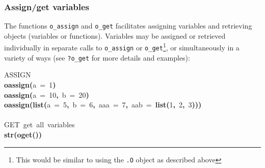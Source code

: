 \documentclass[english,10pt,a4paper]{article}\usepackage{graphicx, color}
\makeatletter
\newcommand{\hlnumber}[1]{\textcolor[rgb]{0,0,0}{#1}}%
\newcommand{\hlfunctioncall}[1]{\textcolor[rgb]{0.501960784313725,0,0.329411764705882}{\textbf{#1}}}%
\newcommand{\hlkeyword}[1]{\textcolor[rgb]{0,0,0}{\textbf{#1}}}%
\newcommand{\hlargument}[1]{\textcolor[rgb]{0.690196078431373,0.250980392156863,0.0196078431372549}{#1}}%
\newcommand{\hlcomment}[1]{\textcolor[rgb]{0.180392156862745,0.6,0.341176470588235}{#1}}%
\newcommand{\hlstd}[1]{\textcolor[rgb]{0,0,0}{#1}}%
\newenvironment{kframe}{%
 \def\FrameCommand##1{\hskip\@totalleftmargin \hskip-\fboxsep
 \colorbox{shadecolor}{##1}\hskip-\fboxsep
     \hskip-\linewidth \hskip-\@totalleftmargin \hskip\columnwidth}%
 \MakeFramed {\advance\hsize-\width
   \@totalleftmargin\z@ \linewidth\hsize
   \@setminipage}}%
 {\par\unskip\endMakeFramed}
\newenvironment{knitrout}{}{} %
\let\code=\texttt
\makeatother
\begin{document}
\subsubsection{Assign/get variables}

The functions \code{o\_assign} and \code{o\_get} facilitates assigning variables
and retrieving objects (variables or functions).
Variables may be assigned or retrieved individually in separate calls to
\code{o\_assign} or \code{o\_get}\footnote{This would be similar to using the
\code{.O} object as described above}, or simultaneously in a variety of ways
(see \code{?o\_get} for more details and examples):

\begin{knitrout}
\color{fgcolor}\begin{kframe}
\begin{flushleft}
\ttfamily\noindent
\hlcomment{\usebox{\hlnormalsizeboxhash}\usebox{\hlnormalsizeboxhash}{\ }ASSIGN}\hspace*{\fill}\\
\hlstd{}\hlfunctioncall{o\usebox{\hlnormalsizeboxunderscore}assign}\hlkeyword{(}\hlargument{a}{\ }\hlargument{=}{\ }\hlnumber{1}\hlkeyword{)}\hspace*{\fill}\\
\hlstd{}\hlfunctioncall{o\usebox{\hlnormalsizeboxunderscore}assign}\hlkeyword{(}\hlargument{a}{\ }\hlargument{=}{\ }\hlnumber{10}\hlkeyword{,}{\ }\hlargument{b}{\ }\hlargument{=}{\ }\hlnumber{20}\hlkeyword{)}\hspace*{\fill}\\
\hlstd{}\hlfunctioncall{o\usebox{\hlnormalsizeboxunderscore}assign}\hlkeyword{(}\hlfunctioncall{list}\hlkeyword{(}\hlargument{a}{\ }\hlargument{=}{\ }\hlnumber{5}\hlkeyword{,}{\ }\hlargument{b}{\ }\hlargument{=}{\ }\hlnumber{6}\hlkeyword{,}{\ }\hlargument{aaa}{\ }\hlargument{=}{\ }\hlnumber{7}\hlkeyword{,}{\ }\hlargument{aab}{\ }\hlargument{=}{\ }\hlfunctioncall{list}\hlkeyword{(}\hlnumber{1}\hlkeyword{,}{\ }\hlnumber{2}\hlkeyword{,}{\ }\hlnumber{3}\hlkeyword{)}\hlkeyword{)}\hlkeyword{)}\hspace*{\fill}\\
\hlstd{}\hspace*{\fill}\\
\hlstd{}\hlcomment{\usebox{\hlnormalsizeboxhash}\usebox{\hlnormalsizeboxhash}{\ }GET{\ }get{\ }all{\ }variables}\hspace*{\fill}\\
\hlstd{}\hlfunctioncall{str}\hlkeyword{(}\hlfunctioncall{o\usebox{\hlnormalsizeboxunderscore}get}\hlkeyword{(}\hlkeyword{)}\hlkeyword{)}\mbox{}

\end{flushleft}
\end{kframe}
\end{knitrout}
\end{document}

